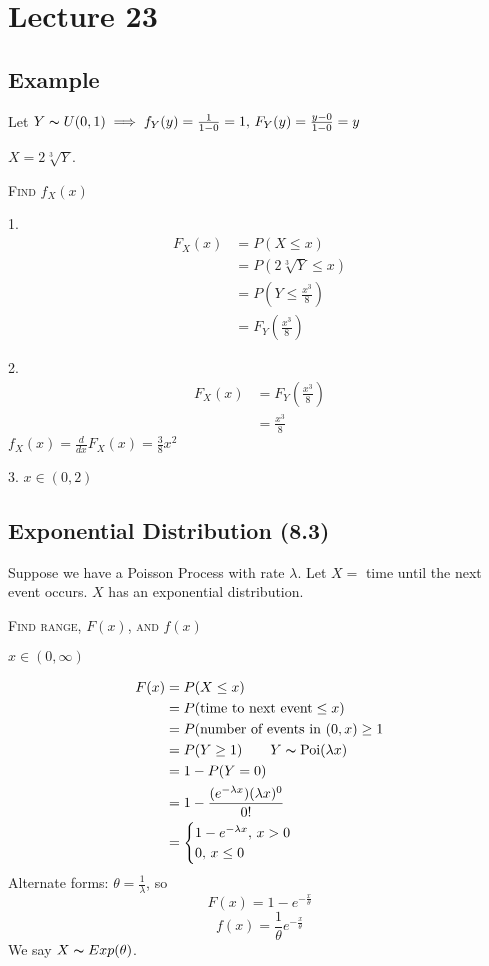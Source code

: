 \section{Lecture 23}
\subsection{Example}
Let $ Y \thicksim U(0,1)\implies f_Y(y)=\frac{1}{1-0}=1,\,
F_Y(y)=\frac{y-0}{1-0}=y $

$ X=2\sqrt[3]{Y} $.

\textsc{Find $ f_X(x) $}

1.
\begin{align*}
    F_X(x)&=P(X\le x)\\
    &=P\left(2\sqrt[3]{Y}\le x\right)\\
    &=P\left(Y\le \frac{x^3}{8}\right)\\
    &=F_Y\left(\frac{x^3}{8} \right)
\end{align*}

2.
\begin{align*}
    F_X(x)&=F_Y\left(\frac{x^3}{8} \right)\\
    &=\frac{x^3}{8}
\end{align*}
$ f_X(x)=\frac{d}{dx}F_X(x)=\frac{3}{8}x^2 $

3. $ x\in(0,2) $

\subsection{Exponential Distribution (8.3)}
Suppose we have a Poisson Process with rate $ \lambda $. Let
$ X= $ time until the next event occurs. $ X $ has an exponential distribution.

\textsc{Find range, $ F(x) $, and $ f(x) $}

$ x\in(0,\infty) $

\begin{align*}
    F(x)&=P(X\le x)\\
    &=P(\text{time to next event}\le x)\\
    &=P(\text{number of events in } (0,x)\ge 1\\
    &=P(Y\ge 1)\qquad Y \thicksim \operatorname{Poi}(\lambda x)\\
    &=1-P(Y=0)\\
    &=1-\frac{(e^{-\lambda x})(\lambda x)^0}{0!}\\
    &=
    \begin{cases}
        1-e^{-\lambda x},\, x>0\\
        0,\, x\le 0
    \end{cases}
\end{align*}
Alternate forms: $ \theta=\frac{1}{\lambda} $, so
\[ F(x)=1-e^{-\frac{x}{\theta}} \]
\[ f(x)=\frac{1}{\theta}e^{-\frac{x}{\theta}} \]
We say $ X \thicksim Exp(\theta) $.
